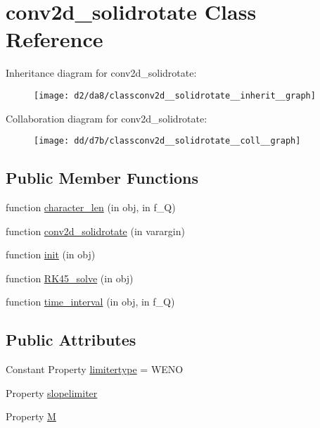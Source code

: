 \hypertarget{classconv2d__solidrotate}{}\section{conv2d\+\_\+solidrotate Class Reference}
\label{classconv2d__solidrotate}


Inheritance diagram for conv2d\+\_\+solidrotate\+:
\nopagebreak
\begin{figure}[H]
\begin{center}
\leavevmode
\texttt{[image: d2/da8/classconv2d\_\_solidrotate\_\_inherit\_\_graph]}
\end{center}
\end{figure}


Collaboration diagram for conv2d\+\_\+solidrotate\+:
\nopagebreak
\begin{figure}[H]
\begin{center}
\leavevmode
\texttt{[image: dd/d7b/classconv2d\_\_solidrotate\_\_coll\_\_graph]}
\end{center}
\end{figure}
\subsection*{Public Member Functions}
\begin{DoxyCompactItemize}
\item 
function \hyperlink{classconv2d__solidrotate_a8d420c4ad2c355f51205e576cf2e158c}{character\+\_\+len} (in obj, in f\+\_\+Q)
\item 
function \hyperlink{classconv2d__solidrotate_ac99907b077d8efb99c98b99eadb33282}{conv2d\+\_\+solidrotate} (in varargin)
\item 
function \hyperlink{classconv2d__solidrotate_ac363844625811bcd6f888a1c26537aec}{init} (in obj)
\item 
function \hyperlink{classconv2d__solidrotate_a7430b64120c77138896f924b876e0797}{R\+K45\+\_\+solve} (in obj)
\item 
function \hyperlink{classconv2d__solidrotate_a1eaac9a56f92f63afbe7dceb058373b4}{time\+\_\+interval} (in obj, in f\+\_\+Q)
\end{DoxyCompactItemize}
\subsection*{Public Attributes}
\begin{DoxyCompactItemize}
\item 
Constant Property \hyperlink{classconv2d__solidrotate_a1e6fd2f9f965314aa88a5e5769487af7}{limitertype} = \textquotesingle{}W\+E\+NO\textquotesingle{}
\item 
Property \hyperlink{classconv2d__solidrotate_a0d7d7e1bb255f5118d39348e81f07f70}{slopelimiter}
\item 
Property \hyperlink{classconv2d__solidrotate_a92e8c54efb4d1abe790e41670721bf34}{M}
\end{DoxyCompactItemize}
